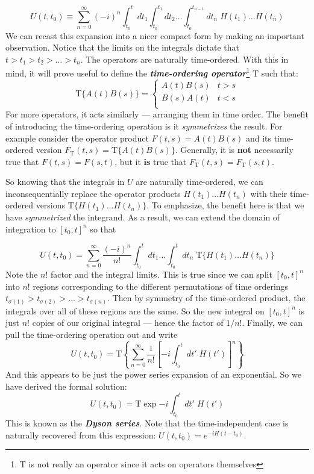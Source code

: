 \documentclass[onecolumn]{gwclass}
\renewcommand{\t}[1]{\text{#1}}
\def \timeorder{\t{T}}
\begin{document}
$$ U(t,t_0) \equiv \sum_{n=0}^\infty (-i)^n \int_{t_0}^t dt_1 \int_{t_0}^{t_1}dt_2\dots \int_{t_0}^{t_{n-1}}dt_n\;H(t_1)\dots H(t_n) $$
We can recast this expansion into a nicer compact form by making an important observation. Notice that the limits on the integrals dictate that $t>t_1 > t_2 > \dots > t_n$. The operators are naturally time-ordered. With this in mind, it will prove useful to define the \textbf{\emph{time-ordering operator}}\footnote{$\timeorder$ is not really an operator since it acts on operators themselves} $\timeorder$ such that:
$$\timeorder\{A(t)B(s)\} = 
\begin{cases}
	A(t)B(s) & t > s \\
	B(s)A(t) & t < s \\
\end{cases}
$$
For more operators, it acts similarly --- arranging them in time order. The benefit of introducing the time-ordering operation is it \emph{symmetrizes} the result. For example consider the operator product $F(t, s)=A(t)B(s)$ and its time-ordered version $F_\timeorder(t,s)=\timeorder\{A(t)B(s)\}$. Generally, it is \textbf{not} necessarily true that $F(t,s)=F(s,t)$, but it \textbf{is} true that $F_\timeorder(t,s)=F_\timeorder(s,t)$. 

So knowing that the integrals in $U$ are naturally time-ordered, we can inconsequentially replace the operator products $H(t_1)\dots H(t_n)$ with their time-ordered versions $\timeorder\{H(t_1)\dots H(t_n)\}$. To emphasize, the benefit here is that we have \emph{symmetrized} the integrand. As a result, we can extend the domain of integration to $[t_0, t]^n$ so that

$$ U(t,t_0) = \sum_{n=0}^\infty \frac{(-i)^n}{n!} \int_{t_0}^t dt_1\dots \int_{t_0}^t dt_n\;\timeorder\{H(t_1)\dots H(t_n)\} $$
Note the $n!$ factor and the integral limits. This is true since we can split $[t_0, t]^n$ into $n!$ regions corresponding to the different permutations of time orderings $t_{\sigma(1)}>t_{\sigma(2)} > \dots > t_{\sigma(n)}$. Then by symmetry of the time-ordered product, the integrals over all of these regions are the same. So the new integral on $[t_0,t]^n$ is just $n!$ copies of our original integral --- hence the factor of $1/n!$. Finally, we can pull the time-ordering operation out and write 
$$ U(t,t_0) = \timeorder\left\{\sum_{n=0}^\infty \frac{1}{n!}\left[-i\int_{t_0}^t dt'\;H(t')\right]^n\right\} $$
And this appears to be just the power series expansion of an exponential. So we have derived the formal solution:
$$ U(t,t_0) = \timeorder\exp{-i\int_{t_0}^t dt'\;H(t')} $$
This is known as the \textbf{\emph{Dyson series}}. Note that the time-independent case is naturally recovered from this expression: $U(t,t_0)=e^{-iH(t-t_0)}$.
\end{document}
